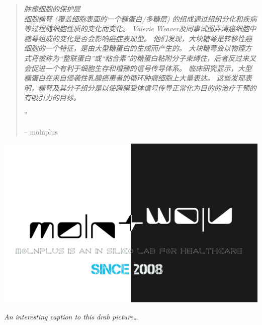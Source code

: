 \documentclass[10pt,a4paper]{article}
\begin{document}
\begin{multicols}{2}
\begin{quotation} %

\noindent\normalsize\textit{肿瘤细胞的保护层\\ 细胞糖萼 (覆盖细胞表面的一个糖蛋白/多糖层) 的组成通过组织分化和疾病等过程随细胞性质的变化而变化。
Valerie Weaver及同事试图弄清癌细胞中糖萼组成的变化是否会影响癌症表现型。
他们发现，大块糖萼是转移性癌细胞的一个特征，是由大型糖蛋白的生成而产生的。
大块糖萼会以物理方式将被称为``整联蛋白''或``粘合素''的糖蛋白粘附分子束缚住，后者反过来又会促进一个有利于细胞生存和增殖的信号传导体系。
临床研究显示，大型糖蛋白在来自侵袭性乳腺癌患者的循环肿瘤细胞上大量表达。
这些发现表明，糖萼及其分子组分是以使跨膜受体信号传导正常化为目的的治疗干预的有吸引力的目标。\cite{PasDuFRos1406,EwaEge1406}}

\hfill{\Huge''}

\hfill-- molnplus
\end{quotation}


\end{multicols} %

\begin{center}
\vspace{10pt}
\includegraphics[width=0.8\linewidth]{molnplus.png} %
\par\large\textit{An interesting caption to this drab picture\ldots}
\vspace{10pt}
\end{center}
\end{document}
